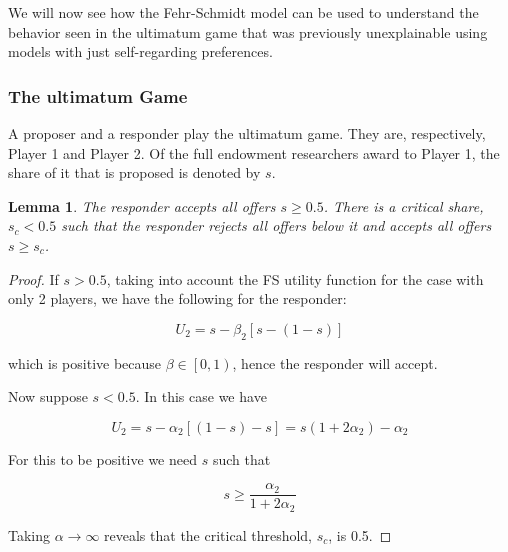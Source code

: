 \documentclass[12pt]{article}
\newtheorem{lemma}[theorem]{Lemma}
\begin{document}


We will now see how the Fehr-Schmidt model can be used to understand the behavior seen in the ultimatum game that was previously unexplainable using models with just self-regarding preferences.

\subsubsection{The ultimatum Game}

A proposer and a responder play the ultimatum game. They are, respectively, Player 1 and Player 2. Of the full endowment researchers award to Player 1, the share of it that is proposed is denoted by $s$.

\begin{lemma}
	The responder accepts all offers $s \geq 0.5$. There is a critical share, $s_c < 0.5$ such that the responder rejects all offers below it and accepts all offers $s \geq s_c$.
\end{lemma}

\begin{proof}
	If $s>0.5$, taking into account the FS utility function for the case with only 2 players, we have the following for the responder:
	
	\begin{equation}
		U_2 = s - \beta_2 \left[s - \left(1-s\right)\right]
	\end{equation}

	\noindent	
	which is positive because $\beta \in \left[0,1\right)$, hence the responder will accept.
	
	Now suppose $s<0.5$. In this case we have
	
	\begin{equation}
		U_2 = s - \alpha_2 \left[\left(1-s\right) - s  \right] = s(1+2\alpha_2)-\alpha_2
	\end{equation}
	
	For this to be positive we need $s$ such that 
	
	\begin{equation*}
		s \geq \frac{\alpha_2}{1+2\alpha_2}
	\end{equation*}
	
	Taking $\alpha \rightarrow \infty$ reveals that the critical threshold, $s_c$, is 0.5.
	
\end{proof}
\end{document}
